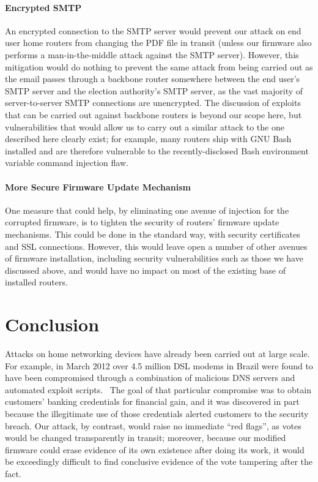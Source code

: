 \documentclass{article}
\begin{document}
\paragraph{Encrypted SMTP}

An encrypted connection to the SMTP server would prevent our attack on
end user home routers from changing the PDF file in transit (unless
our firmware also performs a man-in-the-middle attack against the SMTP
server). However, this mitigation would do nothing to prevent the same
attack from being carried out as the email passes through a backbone
router somewhere between the end user's SMTP server and the election
authority's SMTP server, as the vast majority of server-to-server SMTP
connections are unencrypted. The discussion of exploits that can be
carried out against backbone routers is beyond our scope here, but
vulnerabilities that would allow us to carry out a similar attack to
the one described here clearly exist; for example, many routers ship
with GNU Bash installed and are therefore vulnerable to the
recently-disclosed Bash environment variable command injection flaw.

\paragraph{More Secure Firmware Update Mechanism}

One measure that could help, by eliminating one avenue of injection
for the corrupted firmware, is to tighten the security of routers'
firmware update mechanisms. This could be done in the standard way,
with security certificates and SSL connections. However, this would
leave open a number of other avenues of firmware installation,
including security vulnerabilities such as those we have discussed
above, and would have no impact on most of the existing base of
installed routers.

\section{Conclusion}

Attacks on home networking devices have already been carried out at
large scale. For example, in March 2012 over 4.5 million DSL modems in
Brazil were found to have been compromised through a combination of
malicious DNS servers and automated exploit
scripts.~\cite{BrazilExploit} The goal of that particular compromise
was to obtain customers' banking credentials for financial gain, and
it was discovered in part because the illegitimate use of those
credentials alerted customers to the security breach. Our attack, by
contrast, would raise no immediate ``red flags'', as votes would be
changed transparently in transit; moreover, because our modified
firmware could erase evidence of its own existence after doing its
work, it would be exceedingly difficult to find conclusive evidence of
the vote tampering after the fact.
\end{document}
